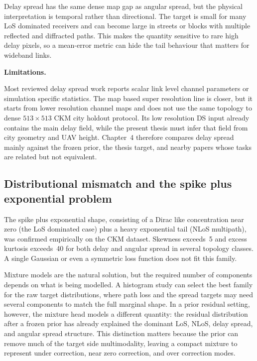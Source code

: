 Delay spread has the same dense map gap as angular spread, but the physical
interpretation is temporal rather than directional. The target is small for
many LoS dominated receivers and can become large in streets or blocks with
multiple reflected and diffracted paths. This makes the quantity sensitive to
rare high delay pixels, so a mean-error metric can hide the tail behaviour that
matters for wideband links.

\par\smallskip
\noindent\textbf{Limitations.}\par
\noindent Most reviewed delay spread work reports scalar link level channel parameters
or simulation specific statistics. The map based super resolution line
\cite{wang2023multitasksr} is closer, but it starts from lower resolution
channel maps and does not use the same topology to dense \(513\times513\) CKM
city holdout protocol. Its low resolution DS input already contains the main
delay field, while the present thesis must infer that field from city geometry
and UAV height. Chapter~4 therefore compares delay spread mainly against the
frozen prior, the thesis target, and nearby papers whose tasks are related but
not equivalent.

\subsection{Distributional mismatch and the spike plus exponential problem}

The spike plus exponential shape, consisting of a Dirac like concentration near zero
(the LoS dominated case) plus a heavy exponential tail (NLoS multipath), was
confirmed empirically on the CKM dataset.  Skewness exceeds~5 and excess kurtosis
exceeds~40 for both delay and angular spread in several topology classes.  A
single Gaussian or even a symmetric loss function does not fit this family.

Mixture models are the natural solution, but the required number of components
depends on what is being modelled. A histogram study can select the best
family for the raw target distributions, where path loss and the spread targets
may need several components to match the full marginal shape. In a
prior residual setting, however, the mixture head models a different quantity:
the residual distribution after a frozen prior has already explained the
dominant LoS, NLoS, delay spread, and angular spread structure. This
distinction matters because the prior can remove much of the target side
multimodality, leaving a compact mixture to represent under correction,
near zero correction, and over correction modes.

